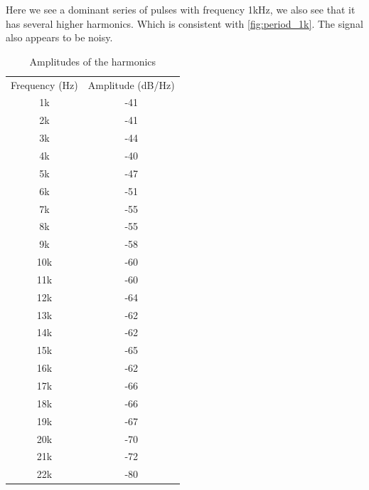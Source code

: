 Here we see a dominant series of pulses with frequency 1kHz, we also see that it has several higher harmonics. Which is consistent with \cref{fig:period_1k}. The signal also appears to be noisy.


\begin{table}[h]
    \centering
    \begin{tabular}{c|c}
        Frequency (Hz) & Amplitude (dB/Hz) \\
        1k  & -41 \\
        2k  & -41 \\
        3k  & -44 \\
        4k  & -40 \\
        5k  & -47 \\
        6k  & -51 \\
        7k  & -55 \\
        8k  & -55 \\
        9k  & -58 \\
        10k & -60 \\
        11k & -60 \\
        12k & -64 \\
        13k & -62 \\
        14k & -62 \\
        15k & -65 \\
        16k & -62 \\
        17k & -66 \\
        18k & -66 \\
        19k & -67 \\
        20k & -70 \\
        21k & -72 \\
        22k & -80
    \end{tabular}
    \caption{Amplitudes of the harmonics}
    \label{tab:1k_amps}
\end{table}

